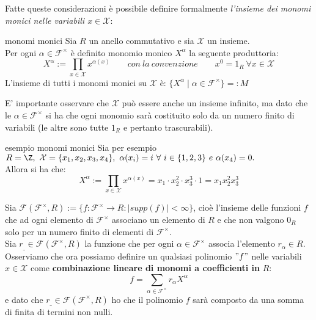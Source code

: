 \noindent
Fatte queste considerazioni è possibile definire formalmente \emph{l'insieme dei monomi monici nelle variabili $x \in \mathcal{X}$}:
\begin{defn}{monomi monici}
	Sia $R$ un anello commutativo e sia $\mathcal{X}$ un insieme.\\
	Per ogni $\alpha \in \mathcal{F}^\times$ è definito monomio monico $X^\alpha$ la seguente produttoria:
	\[X^\alpha := \prod_{x \in \mathcal{X}}x^{\alpha(x)} \qquad con \ la \ convenzione \qquad x^0 = 1_R \ \forall x \in \mathcal{X}\]
	L'insieme di tutti i monomi monici su $\mathcal{X}$ è: $\{X^\alpha \mid \alpha \in \mathcal{F}^\times\} =: M$
\end{defn}

\noindent
E' importante osservare che $\mathcal{X}$ può essere anche un insieme infinito, ma dato che le $\alpha \in \mathcal{F}^\times$ 
si ha che ogni monomio sarà costituito solo da un numero finito di variabili (le altre sono tutte $1_R$ e pertanto trascurabili).

\newpage

\begin{example}[]{esempio monomi monici}
	Sia per esempio $R = \Z, \ \mathcal{X} = \{x_1, x_2, x_3, x_4\}, \ \alpha(x_i) = i \ \forall \ i \in \{1, 2, 3\} \ e \ \alpha(x_4) = 0.$\\
	Allora si ha che:
	\[X^\alpha := \prod_{x \in \mathcal{X}}x^{\alpha(x)} = x_1 \cdot x_2^2 \cdot x_3^3 \cdot 1 = x_1x_2^2x_3^3\]
\end{example}


\noindent Sia $\mathcal{F}(\mathcal{F}^\times,R) := \{f : \mathcal{F}^\times \rightarrow R : \vert supp(f) \vert < \infty\}$, 
cioè l'insieme delle funzioni $f$ che ad ogni elemento di $\mathcal{F}^\times$ associano un elemento di $R$ e che non valgono $0_R$ 
solo per un numero finito di elementi di $\mathcal{F}^\times$.\\
Sia $r_{\_} \in \mathcal{F}(\mathcal{F}^\times,R)$ la funzione che per ogni $\alpha \in \mathcal{F}^\times$ associa l'elemento $r_\alpha \in R$. 
Osserviamo che ora possiamo definire un qualsiasi polinomio $"f"$ nelle variabili $x \in \mathcal{X}$ come 
\textbf{combinazione lineare di monomi a coefficienti in} $R$:
\[f = \sum_{\alpha \in \mathcal{F}^\times}r_\alpha X^\alpha\]
e dato che $r_{\_} \in \mathcal{F}(\mathcal{F}^\times,R)$ ho che il polinomio $f$ sarà composto da una somma di finita di termini non nulli.\\

